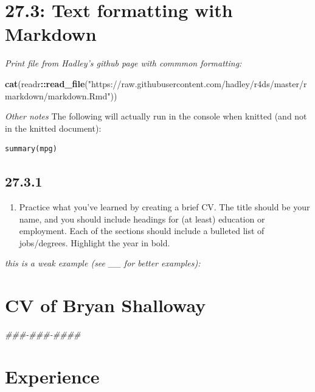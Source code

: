 \documentclass[]{book}
\newenvironment{Shaded}{\begin{snugshade}}{\end{snugshade}}
\newcommand{\KeywordTok}[1]{\textcolor[rgb]{0.13,0.29,0.53}{\textbf{#1}}}
\newcommand{\NormalTok}[1]{#1}
\newcommand{\OperatorTok}[1]{\textcolor[rgb]{0.81,0.36,0.00}{\textbf{#1}}}
\newcommand{\StringTok}[1]{\textcolor[rgb]{0.31,0.60,0.02}{#1}}
\providecommand{\tightlist}{%
  \setlength{\itemsep}{0pt}\setlength{\parskip}{0pt}}
\theoremstyle{definition}
\theoremstyle{definition}
\theoremstyle{definition}
\theoremstyle{remark}
\begin{document}
\hypertarget{text-formatting-with-markdown}{%
\section{27.3: Text formatting with
Markdown}\label{text-formatting-with-markdown}}

\emph{Print file from Hadley's github page with commmon formatting:}

\begin{Shaded}
\begin{Highlighting}[]
\KeywordTok{cat}\NormalTok{(readr}\OperatorTok{::}\KeywordTok{read_file}\NormalTok{(}\StringTok{"https://raw.githubusercontent.com/hadley/r4ds/master/rmarkdown/markdown.Rmd"}\NormalTok{))}
\end{Highlighting}
\end{Shaded}

\emph{Other notes} The following will actually run in the console when
knitted (and not in the knitted document):

\begin{verbatim}
summary(mpg)
\end{verbatim}

\hypertarget{section-93}{%
\subsection{27.3.1}\label{section-93}}

\begin{enumerate}
\def\labelenumi{\arabic{enumi}.}
\tightlist
\item
  Practice what you've learned by creating a brief CV. The title should
  be your name, and you should include headings for (at least) education
  or employment. Each of the sections should include a bulleted list of
  jobs/degrees. Highlight the year in bold.
\end{enumerate}

\emph{this is a weak example (see \_\_ for better examples):}

\hypertarget{cv-of-bryan-shalloway}{%
\section{\texorpdfstring{\textbf{CV of Bryan
Shalloway}}{CV of Bryan Shalloway}}\label{cv-of-bryan-shalloway}}

\emph{\#\#\#-\#\#\#-\#\#\#\#}

\hypertarget{experience}{%
\section{Experience}\label{experience}}
\end{document}
